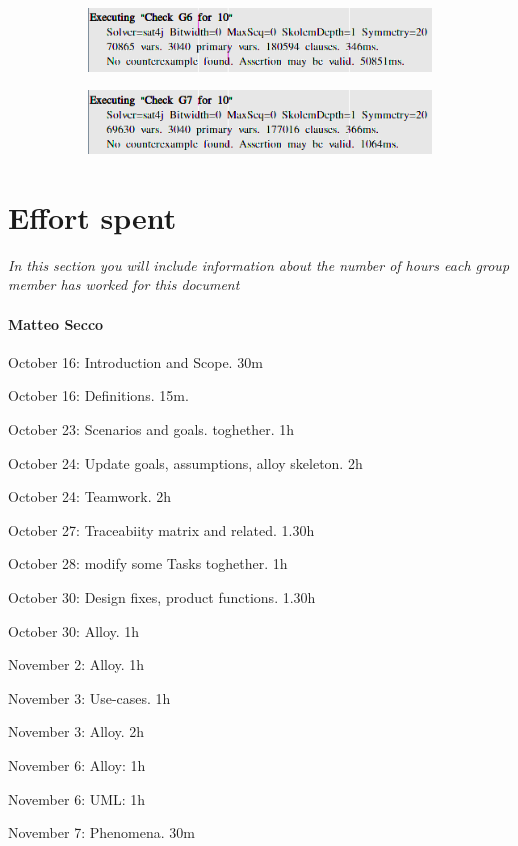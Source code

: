 \documentclass{article}
\begin{document}
\begin{figure}
\begin{subfigure}[H]{\linewidth}
		\end{subfigure}
		\begin{subfigure}[H]{\linewidth}
			\includegraphics[width=\linewidth]{Images/Alloy_G6.png}
		\end{subfigure}
		\begin{subfigure}[H]{\linewidth}
			\includegraphics[width=\linewidth]{Images/Alloy_G7.png}
		\end{subfigure}
	\end{figure}
	
\newpage
\section{Effort spent} \textit{In this section you will include information about the number of hours each group member has worked for this document}

	\paragraph{Matteo Secco} 
		\begin{list}{-}{}
			\item October 16: Introduction and Scope. 30m
			\item October 16: Definitions. 15m.
			\item October 23: Scenarios and goals. toghether. 1h
			\item October 24: Update goals, assumptions, alloy skeleton. 2h
			\item October 24: Teamwork. 2h
			\item October 27: Traceabiity matrix and related. 1.30h
			\item October 28: modify some Tasks toghether. 1h
			\item October 30: Design fixes, product functions. 1.30h
			\item October 30: Alloy. 1h
			\item November 2: Alloy. 1h
			\item November 3: Use-cases. 1h
			\item November 3: Alloy. 2h
			\item November 6: Alloy: 1h
			\item November 6: UML: 1h
			\item November 7: Phenomena. 30m
		\end{list}
		
\end{document}

